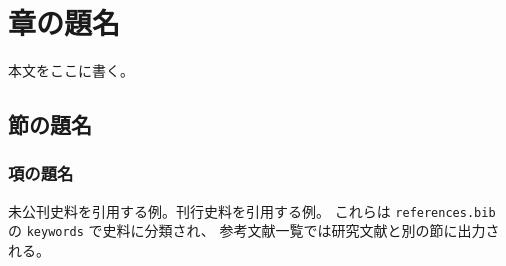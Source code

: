 \chapter{章の題名}

本文をここに書く。

\section{節の題名}

\subsection{項の題名}

未公刊史料を引用する例\autocite{archive_sample}。刊行史料を引用する例\autocite{printed_sample}。
これらは \verb|references.bib| の \verb|keywords| で史料に分類され、
参考文献一覧では研究文献と別の節に出力される。
